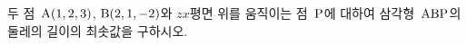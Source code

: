 두 점~$\mathrm{A}(1{,}\mkern3mu\mathopen{}2{,}\mkern3mu\mathopen{}3)$, $\mathrm{B}(2{,}\mkern3mu\mathopen{}1{,}\mkern3mu\mathopen{}-2)$와 $zx$평면 위를 움직이는 점~$\mathrm{P}$에 대하여 삼각형~$\mathrm{ABP}$의 둘레의 길이의 최솟값을 구하시오.
